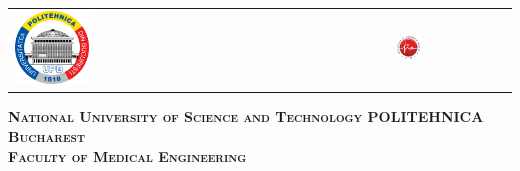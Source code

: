 



\begin{titlepage}
	\centering
	\begin{tabular}{p{6cm}p{3.3cm}}
		\includegraphics[width=0.2\textwidth]{img/upb.png} &
		\includegraphics[width=0.21\textwidth]{img/fim.png}
	\end{tabular}
	\vspace{1cm}

	{\scshape\Large \textbf{National University of Science and Technology POLITEHNICA Bucharest} \\}
	{\scshape\Large \textbf{Faculty of Medical Engineering} \\}
	
\end{titlepage}

